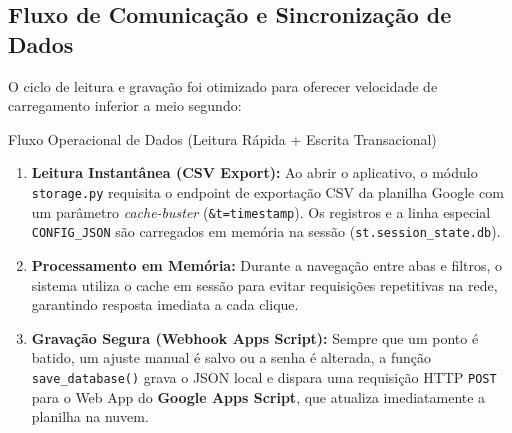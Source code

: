 \documentclass[11pt,a4paper]{article}
\begin{document}
\subsection{Fluxo de Comunicação e Sincronização de Dados}
O ciclo de leitura e gravação foi otimizado para oferecer velocidade de carregamento inferior a meio segundo:

\begin{infoBox}{Fluxo Operacional de Dados (Leitura Rápida + Escrita Transacional)}
\begin{enumerate}[leftmargin=1.5em, itemsep=2pt]
    \item \textbf{Leitura Instantânea (CSV Export):} Ao abrir o aplicativo, o módulo \texttt{storage.py} requisita o endpoint de exportação CSV da planilha Google com um parâmetro \textit{cache-buster} (\texttt{\&t=timestamp}). Os registros e a linha especial \texttt{CONFIG\_JSON} são carregados em memória na sessão (\texttt{st.session\_state.db}).
    \item \textbf{Processamento em Memória:} Durante a navegação entre abas e filtros, o sistema utiliza o cache em sessão para evitar requisições repetitivas na rede, garantindo resposta imediata a cada clique.
    \item \textbf{Gravação Segura (Webhook Apps Script):} Sempre que um ponto é batido, um ajuste manual é salvo ou a senha é alterada, a função \texttt{save\_database()} grava o JSON local e dispara uma requisição HTTP \texttt{POST} para o Web App do \textbf{Google Apps Script}, que atualiza imediatamente a planilha na nuvem.
\end{enumerate}
\end{infoBox}
\end{document}
